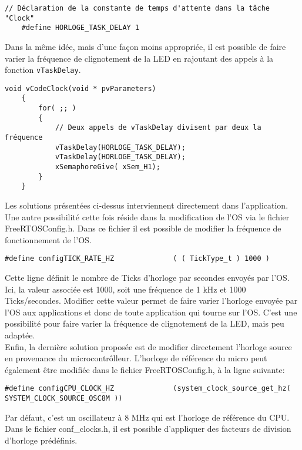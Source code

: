 \begin{lstlisting}[style=CStyle]
    // Déclaration de la constante de temps d'attente dans la tâche "Clock"
    #define HORLOGE_TASK_DELAY 1
\end{lstlisting}

Dans la même idée, mais d'une façon moins appropriée, il est possible de faire varier la fréquence de clignotement de la LED en rajoutant des appels à la fonction \texttt{vTaskDelay}.

\begin{lstlisting}[style=CStyle]
    void vCodeClock(void * pvParameters)
    {
        for( ;; )
        {
            // Deux appels de vTaskDelay divisent par deux la fréquence
            vTaskDelay(HORLOGE_TASK_DELAY);
            vTaskDelay(HORLOGE_TASK_DELAY);
            xSemaphoreGive( xSem_H1);
        }
    }
\end{lstlisting}

Les solutions présentées ci-dessus interviennent directement dans l'application.
Une autre possibilité cette fois réside dans la modification de l'OS via le fichier FreeRTOSConfig.h.
Dans ce fichier il est possible de modifier la fréquence de fonctionnement de l'OS.

\begin{lstlisting}[style=CStyle]
    #define configTICK_RATE_HZ				( ( TickType_t ) 1000 )
\end{lstlisting}

Cette ligne définit le nombre de Ticks d'horloge par secondes envoyés par l'OS.
Ici, la valeur associée est 1000, soit une fréquence de 1 kHz et 1000 Ticks/secondes.
Modifier cette valeur permet de faire varier l'horloge envoyée par l'OS aux applications et donc de toute application qui tourne sur l'OS.
C'est une possibilité pour faire varier la fréquence de clignotement de la LED, mais peu adaptée.\\

Enfin, la dernière solution proposée est de modifier directement l'horloge source en provenance du microcontrôlleur.
L'horloge de référence du micro peut également être modifiée dans le fichier FreeRTOSConfig.h, à la ligne suivante:

\begin{lstlisting}[style=CStyle]
    #define configCPU_CLOCK_HZ				(system_clock_source_get_hz( SYSTEM_CLOCK_SOURCE_OSC8M ))
\end{lstlisting}

Par défaut, c'est un oscillateur à 8 MHz qui est l'horloge de référence du CPU.
Dans le fichier conf\_clocks.h, il est possible d'appliquer des facteurs de division d'horloge prédéfinis.


